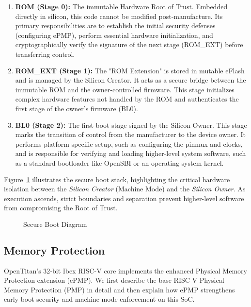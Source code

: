 \documentclass[10pt,a4paper,twocolumn,twoside]{article}
\begin{document}
\begin{enumerate}
    \item \textbf{ROM (Stage 0):} The immutable Hardware Root of Trust. Embedded directly in silicon, this code cannot be modified post-manufacture. Its primary responsibilities are to establish the initial security defenses (configuring ePMP), perform essential hardware initialization, and cryptographically verify the signature of the next stage (ROM\_EXT) before transferring control.

    \item \textbf{ROM\_EXT (Stage 1):} The "ROM Extension" is stored in mutable eFlash and is managed by the Silicon Creator. It acts as a secure bridge between the immutable ROM and the owner-controlled firmware. This stage initializes complex hardware features not handled by the ROM and authenticates the first stage of the owner's firmware (BL0).

    \item \textbf{BL0 (Stage 2):} The first boot stage signed by the Silicon Owner. This stage marks the transition of control from the manufacturer to the device owner. It performs platform-specific setup, such as configuring the pinmux and clocks, and is responsible for verifying and loading higher-level system software, such as a standard bootloader like OpenSBI or an operating system kernel.
\end{enumerate}

Figure~\ref{logical_sec_model} illustrates the secure boot stack, highlighting the critical hardware isolation between the \emph{Silicon Creator} (Machine Mode) and the \emph{Silicon Owner}. As execution ascends, strict boundaries and separation prevent higher-level software from compromising the Root of Trust.

\begin{figure}[!h]
\centering
	
	\caption{Secure Boot Diagram}
	\label{logical_sec_model}
\end{figure}

\subsection{Memory Protection}
OpenTitan's 32-bit Ibex RISC-V core implements the enhanced Physical Memory Protection extension (ePMP). We first describe the base RISC-V Physical Memory Protection (PMP) in detail and then explain how ePMP strengthens early boot security and machine mode enforcement on this SoC.
\end{document}
